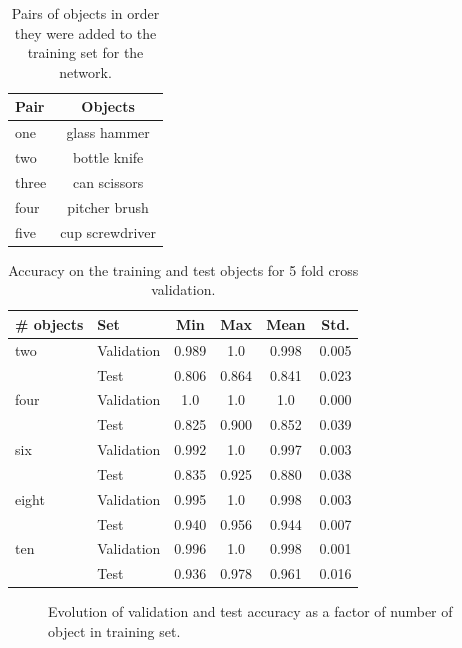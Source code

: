 \begin{table}
	\centering
	\begin{tabular}{l | c}
		\hline
		Pair  & Objects \\ \hline
		one   & glass hammer \\
		two   & bottle knife \\
		three & can scissors \\
		four  & pitcher brush \\
		five  & cup screwdriver \\
		\hline
	\end{tabular}
	\caption{Pairs of objects in order they were added to the training set for the network.}
	\label{tab:obj_pairs}
\end{table}

\begin{table}
	\centering
	\begin{tabular}{l | l | c | c | c | c}
		\hline
		\# objects & Set        & Min   & Max   & Mean  & Std.  \\ \hline
		two       & Validation & 0.989 & 1.0   & 0.998 & 0.005 \\
		          & Test       & 0.806 & 0.864 & 0.841 & 0.023 \\ \hline
		four      & Validation & 1.0   & 1.0   & 1.0   & 0.000 \\
		          & Test       & 0.825 & 0.900 & 0.852 & 0.039 \\ \hline
		six       & Validation & 0.992 & 1.0   & 0.997 & 0.003 \\
		          & Test       & 0.835 & 0.925 & 0.880 & 0.038 \\ \hline
		eight     & Validation & 0.995 & 1.0   & 0.998 & 0.003 \\
		          & Test       & 0.940 & 0.956 & 0.944 & 0.007 \\ \hline
		ten       & Validation & 0.996 & 1.0   & 0.998 & 0.001 \\
		          & Test       & 0.936 & 0.978 & 0.961 & 0.016 \\ \hline
	\end{tabular}
	\caption{Accuracy on the training and test objects for 5 fold cross validation.}
	\label{tab:results_perobj}
\end{table}

\begin{figure}
	
	\caption{Evolution of validation and test accuracy as a factor of number of object in training set.}
	\label{fig:object_impact}
\end{figure}

